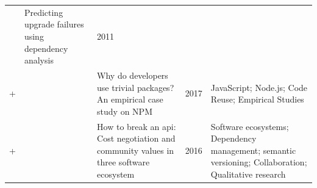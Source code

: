 \documentclass[]{book}
\begin{document}
\begin{longtable}[]{@{}lllll@{}}
\begin{minipage}[t]{0.09\columnwidth}
\citet{Abate2011}\strut
\end{minipage} & \begin{minipage}[t]{0.34\columnwidth}\raggedright\strut
Predicting upgrade failures using dependency analysis\strut
\end{minipage} & \begin{minipage}[t]{0.02\columnwidth}\raggedright\strut
2011\strut
\end{minipage} & \begin{minipage}[t]{0.39\columnwidth}\raggedright\strut
\strut
\end{minipage}\tabularnewline
\begin{minipage}[t]{0.01\columnwidth}\raggedright\strut
+\strut
\end{minipage} & \begin{minipage}[t]{0.09\columnwidth}\raggedright\strut
\citet{Abdalkareem2017}\strut
\end{minipage} & \begin{minipage}[t]{0.34\columnwidth}\raggedright\strut
Why do developers use trivial packages? An empirical case study on
NPM\strut
\end{minipage} & \begin{minipage}[t]{0.02\columnwidth}\raggedright\strut
2017\strut
\end{minipage} & \begin{minipage}[t]{0.39\columnwidth}\raggedright\strut
JavaScript; Node.js; Code Reuse; Empirical Studies\strut
\end{minipage}\tabularnewline
\begin{minipage}[t]{0.01\columnwidth}\raggedright\strut
+\strut
\end{minipage} & \begin{minipage}[t]{0.09\columnwidth}\raggedright\strut
\citet{Bogart2016}\strut
\end{minipage} & \begin{minipage}[t]{0.34\columnwidth}\raggedright\strut
How to break an api: Cost negotiation and community values in three
software ecosystem\strut
\end{minipage} & \begin{minipage}[t]{0.02\columnwidth}\raggedright\strut
2016\strut
\end{minipage} & \begin{minipage}[t]{0.39\columnwidth}\raggedright\strut
Software ecosystems; Dependency management; semantic versioning;
Collaboration; Qualitative research\strut
\end{minipage}\tabularnewline

\end{longtable}
\end{document}
